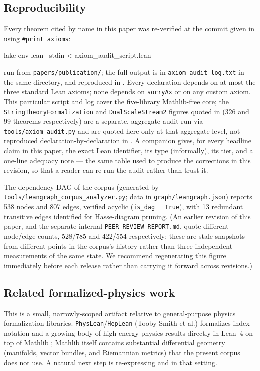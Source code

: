 \documentclass[11pt,a4paper]{article}
\theoremstyle{remark}
\begin{document}
\subsection{Reproducibility}
Every theorem cited by name in this paper was re-verified at the commit given in 
using \texttt{\#print axioms}:
\begin{center}
\footnotesize\ttfamily
lake env lean --stdin < axiom\_audit\_script.lean
\end{center}
run from \texttt{papers/publication/}; the full output is in \texttt{axiom\_audit\_log.txt} in the
same directory, and reproduced in . Every declaration depends on at most the three
standard Lean axioms; none depends on \texttt{sorryAx} or on any custom axiom. This particular script
and log cover the five-library Mathlib-free core; the \texttt{StringTheoryFormalization} and
\texttt{DualScaleStream2} figures quoted in  (326 and 99 theorems respectively) are
a separate, aggregate audit run via \texttt{tools/axiom\_\discretionary{}{}{}audit.py} and are quoted
here only at that aggregate level, not reproduced declaration-by-declaration in . A companion
 gives, for every headline claim in this paper, the exact Lean identifier, its type
(informally), its tier, and a one-line adequacy note --- the same table used to produce the
corrections in this revision, so that a reader can re-run the audit rather than trust it.

The dependency DAG of the corpus (generated by \texttt{tools/leangraph\_corpus\_analyzer.py}; data
in \texttt{graph/leangraph.json}) reports 538 nodes and 807 edges, verified acyclic
(\texttt{is\_dag} = \texttt{True}), with 13 redundant transitive edges identified for Hasse-diagram
pruning. (An earlier revision of this paper, and the separate internal
\texttt{PEER\_REVIEW\_REPORT.md}, quote different node/edge counts, 528/785 and 422/554
respectively; these are stale snapshots from different points in the corpus's history rather than
three independent measurements of the same state. We recommend regenerating this figure immediately
before each release rather than carrying it forward across revisions.)

\subsection{Related formalized-physics work}
This is a small, narrowly-scoped artifact relative to general-purpose physics formalization
libraries. \texttt{PhysLean}/\texttt{HepLean} (Tooby-Smith et al.) formalizes index notation and a
growing body of high-energy-physics results directly in Lean~4 on top of Mathlib
\cite{ToobySmith2024}; Mathlib itself contains substantial differential geometry (manifolds, vector
bundles, and Riemannian metrics) that the present corpus does not use. A natural next step is
re-expressing  and  in that setting.
\end{document}
